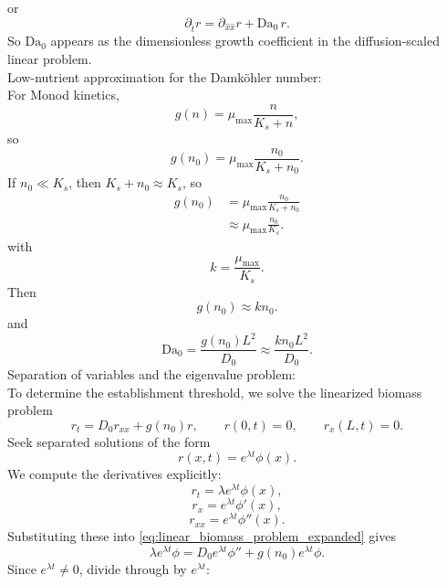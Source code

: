 \documentclass[11pt,a4paper]{report}
\begin{document}
	or
	\begin{equation}
		\partial_{\hat{t}}r
		=
		\partial_{\hat{x}\hat{x}}r
		+
		\mathrm{Da}_0\,r.
		\label{eq:Da0_nondim_linear_expanded}
	\end{equation}
	So $\mathrm{Da}_0$ appears as the dimensionless growth coefficient in the diffusion-scaled linear problem.\\
	Low-nutrient approximation for the Damk\"ohler number:\\
	For Monod kinetics,
	\begin{equation}
		g(n)=\mu_{\max}\frac{n}{K_s+n},
	\end{equation}
	so
	\begin{equation}
		g(n_0)=\mu_{\max}\frac{n_0}{K_s+n_0}.
		\label{eq:g_n0_monod_expanded}
	\end{equation}
	If $n_0\ll K_s$, then $K_s+n_0\approx K_s$, so
	\begin{align}
		g(n_0)
		&=
		\mu_{\max}\frac{n_0}{K_s+n_0}
		\\
		&\approx
		\mu_{\max}\frac{n_0}{K_s}.
	\end{align}
	with
	\begin{equation}
		k=\frac{\mu_{\max}}{K_s}.
	\end{equation}
	Then
	\begin{equation}
		g(n_0)\approx k n_0.
	\end{equation}
	and
	\begin{equation}
		\mathrm{Da}_0
		=
		\frac{g(n_0)L^2}{D_0}
		\approx
		\frac{k n_0 L^2}{D_0}.
	\end{equation}
	Separation of variables and the eigenvalue problem:\\
	To determine the establishment threshold, we solve the linearized biomass problem
	\begin{equation}
		r_t=D_0 r_{xx}+g(n_0)r,
		\qquad
		r(0,t)=0,
		\qquad
		r_x(L,t)=0.
		\label{eq:linear_biomass_problem_expanded}
	\end{equation}
	Seek separated solutions of the form
	\begin{equation}
		r(x,t)=e^{\lambda t}\phi(x).
		\label{eq:normal_mode_ansatz_expanded}
	\end{equation}
	We compute the derivatives explicitly:
	\[
	r_t
	=
	\lambda e^{\lambda t}\phi(x),
	\]
	\[
	r_x
	=
	e^{\lambda t}\phi'(x),
	\]
	\[
	r_{xx}
	=
	e^{\lambda t}\phi''(x).
	\]
	Substituting these into \eqref{eq:linear_biomass_problem_expanded} gives
	\[
	\lambda e^{\lambda t}\phi
	=
	D_0 e^{\lambda t}\phi''
	+
	g(n_0)e^{\lambda t}\phi.
	\]
	Since $e^{\lambda t}\neq 0$, divide through by $e^{\lambda t}$:
\end{document}
